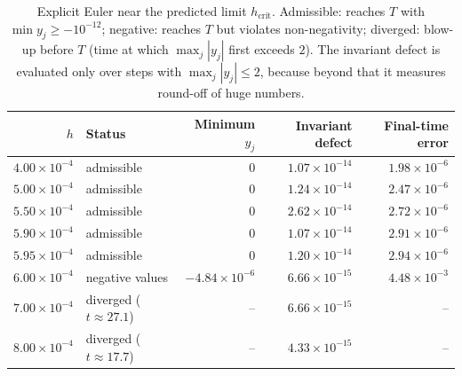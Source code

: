 \begin{table}[H]
\centering
\caption{Explicit Euler near the predicted limit $h_{\mathrm{crit}}$. Admissible: reaches $T$ with $\min y_j\ge-10^{-12}$; negative: reaches $T$ but violates non-negativity; diverged: blow-up before $T$ (time at which $\max_j|y_j|$ first exceeds $2$). The invariant defect is evaluated only over steps with $\max_j|y_j|\le2$, because beyond that it measures round-off of huge numbers.}
\label{tab:boundary}
\small
\begin{tabular}{rlrrr}
\toprule
$h$ & Status & Minimum $y_j$ & Invariant defect & Final-time error\\
\midrule
$4.00\times10^{-4}$ & admissible & $0$ & $1.07\times10^{-14}$ & $1.98\times10^{-6}$\\
$5.00\times10^{-4}$ & admissible & $0$ & $1.24\times10^{-14}$ & $2.47\times10^{-6}$\\
$5.50\times10^{-4}$ & admissible & $0$ & $2.62\times10^{-14}$ & $2.72\times10^{-6}$\\
$5.90\times10^{-4}$ & admissible & $0$ & $1.07\times10^{-14}$ & $2.91\times10^{-6}$\\
$5.95\times10^{-4}$ & admissible & $0$ & $1.20\times10^{-14}$ & $2.94\times10^{-6}$\\
$6.00\times10^{-4}$ & negative values & $-4.84\times10^{-6}$ & $6.66\times10^{-15}$ & $4.48\times10^{-3}$\\
$7.00\times10^{-4}$ & diverged ($t\approx27.1$) & -- & $6.66\times10^{-15}$ & --\\
$8.00\times10^{-4}$ & diverged ($t\approx17.7$) & -- & $4.33\times10^{-15}$ & --\\
\bottomrule
\end{tabular}
\end{table}
